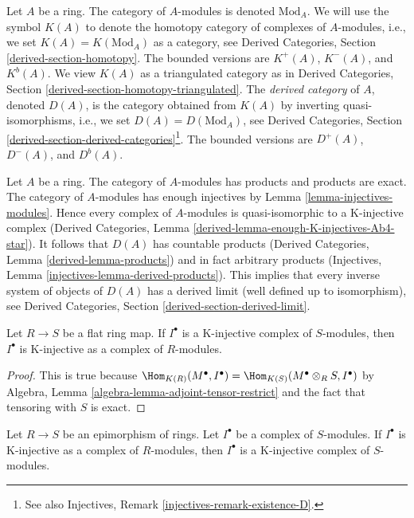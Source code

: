 \medskip\noindent
Let $A$ be a ring. The category of $A$-modules is denoted $\text{Mod}_A$.
We will use the symbol $K(A)$ to denote the homotopy category of complexes
of $A$-modules, i.e., we set $K(A) = K(\text{Mod}_A)$ as a category, see
Derived Categories, Section \ref{derived-section-homotopy}. The bounded
versions are $K^+(A)$, $K^-(A)$, and $K^b(A)$.
We view $K(A)$ as a triangulated category as in
Derived Categories, Section \ref{derived-section-homotopy-triangulated}.
The {\it derived category} of $A$, denoted $D(A)$, is the category
obtained from $K(A)$ by inverting quasi-isomorphisms, i.e., we set
$D(A) = D(\text{Mod}_A)$, see
Derived Categories, Section
\ref{derived-section-derived-categories}\footnote{See also
Injectives, Remark \ref{injectives-remark-existence-D}.}.
The bounded versions are $D^+(A)$, $D^-(A)$, and $D^b(A)$.

\medskip\noindent
Let $A$ be a ring. The category of $A$-modules has products and products are
exact. The category of $A$-modules has enough injectives by
Lemma \ref{lemma-injectives-modules}. Hence every complex of $A$-modules
is quasi-isomorphic to a K-injective complex
(Derived Categories, Lemma \ref{derived-lemma-enough-K-injectives-Ab4-star}).
It follows that $D(A)$ has countable products
(Derived Categories, Lemma \ref{derived-lemma-products})
and in fact arbitrary products
(Injectives, Lemma \ref{injectives-lemma-derived-products}).
This implies that every inverse system of objects of $D(A)$
has a derived limit (well defined up to isomorphism), see
Derived Categories, Section \ref{derived-section-derived-limit}.

\begin{lemma}
\label{lemma-K-injective-flat}
Let $R \to S$ be a flat ring map. If $I^\bullet$ is a K-injective
complex of $S$-modules, then $I^\bullet$ is K-injective as a
complex of $R$-modules.
\end{lemma}

\begin{proof}
This is true because
$\Hom_{K(R)}(M^\bullet, I^\bullet) =
\Hom_{K(S)}(M^\bullet \otimes_R S, I^\bullet)$
by Algebra, Lemma \ref{algebra-lemma-adjoint-tensor-restrict}
and the fact that tensoring with $S$ is exact.
\end{proof}

\begin{lemma}
\label{lemma-K-injective-epimorphism}
Let $R \to S$ be an epimorphism of rings. Let $I^\bullet$ be a complex
of $S$-modules. If $I^\bullet$ is K-injective as a complex of
$R$-modules, then $I^\bullet$ is a K-injective complex of $S$-modules.
\end{lemma}

